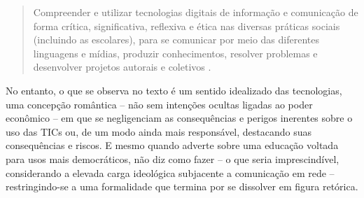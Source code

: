 \documentclass[portuguese]{textolivre}
\begin{document}
\begin{quote}
    Compreender e utilizar tecnologias digitais de informação e comunicação de forma crítica, significativa, reflexiva e ética nas diversas práticas sociais (incluindo as escolares), para se comunicar por meio das diferentes linguagens e mídias, produzir conhecimentos, resolver problemas e desenvolver projetos autorais e coletivos \cite[p. 65]{brasil_base_2018}.
\end{quote}

No entanto, o que se observa no texto é um sentido idealizado das tecnologias, uma concepção romântica – não sem intenções ocultas ligadas ao poder econômico – em que se negligenciam as consequências e perigos inerentes sobre o uso das TICs ou, de um modo ainda mais responsável, destacando suas consequências e riscos. E mesmo quando adverte sobre uma educação voltada para usos mais democráticos, não diz como fazer – o que seria imprescindível, considerando a elevada carga ideológica subjacente a comunicação em rede – restringindo-se a uma formalidade que termina por se dissolver em figura retórica.
\end{document}
